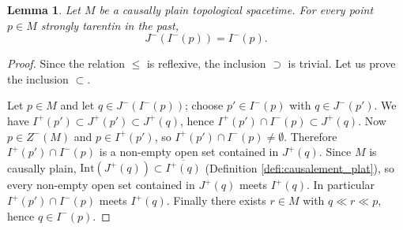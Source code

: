 \documentclass[a4paper,twoside]{article}
\newtheorem{lem}{Lemma}[section]
\begin{document}
\begin{lem}\label{lem:passe_coherent} Let $M$ be a causally plain topological spacetime.
For every point $p\in M$ strongly tarentin in the past, $$J^-(I^-(p))= I^-(p).$$
\end{lem}
\begin{proof}
Since the relation $\leq$ is reflexive, the inclusion $\supset$ is trivial. Let us prove the inclusion $\subset$.

Let $p\in M$ and let $q\in J^-(I^-(p))$; choose $p'\in I^-(p)$ with $q\in J^-(p')$.
We have $I^+(p')\subset J^+(p')\subset J^+(q)$, hence $I^+(p')\cap I^-(p)\subset J^+(q)$. Now
$p\in Z^-(M)$ and $p\in I^+(p')$, so $I^+(p')\cap I^-(p)\neq \emptyset$.
Therefore $I^+(p')\cap I^-(p)$ is a non-empty open set contained in $J^+(q)$. Since $M$ is causally plain, $\mathrm{Int}(J^+(q))\subset \overline {I^+(q)}$ (Definition \ref{defi:causalement_plat}), so every non-empty open set contained in $J^+(q)$ meets $I^+(q)$. In particular $I^+(p')\cap I^-(p)$ meets $I^+(q)$.
Finally there exists $r\in M$ with $q\ll r\ll p$, hence $q\in I^-(p)$.
\end{proof}
\end{document}

